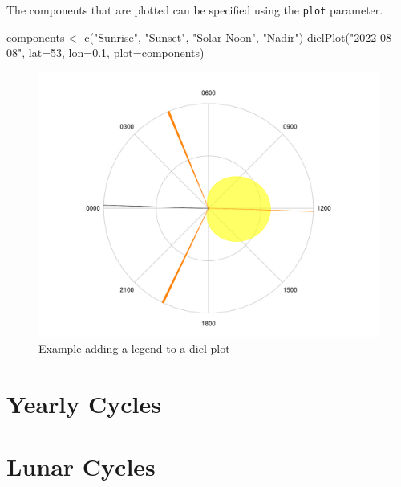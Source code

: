 \documentclass[
]{book}
\newenvironment{Shaded}{\begin{snugshade}}{\end{snugshade}}
\newcommand{\AttributeTok}[1]{\textcolor[rgb]{0.77,0.63,0.00}{#1}}
\newcommand{\DecValTok}[1]{\textcolor[rgb]{0.00,0.00,0.81}{#1}}
\newcommand{\FloatTok}[1]{\textcolor[rgb]{0.00,0.00,0.81}{#1}}
\newcommand{\FunctionTok}[1]{\textcolor[rgb]{0.00,0.00,0.00}{#1}}
\newcommand{\NormalTok}[1]{#1}
\newcommand{\OtherTok}[1]{\textcolor[rgb]{0.56,0.35,0.01}{#1}}
\newcommand{\StringTok}[1]{\textcolor[rgb]{0.31,0.60,0.02}{#1}}
\begin{document}
The components that are plotted can be specified using the \texttt{plot} parameter.

\begin{Shaded}
\begin{Highlighting}[]
\NormalTok{components }\OtherTok{\textless{}{-}} \FunctionTok{c}\NormalTok{(}\StringTok{"Sunrise"}\NormalTok{, }\StringTok{"Sunset"}\NormalTok{, }\StringTok{"Solar Noon"}\NormalTok{, }\StringTok{"Nadir"}\NormalTok{)}
\FunctionTok{dielPlot}\NormalTok{(}\StringTok{"2022{-}08{-}08"}\NormalTok{, }\AttributeTok{lat=}\DecValTok{53}\NormalTok{, }\AttributeTok{lon=}\FloatTok{0.1}\NormalTok{, }\AttributeTok{plot=}\NormalTok{components)}
\end{Highlighting}
\end{Shaded}

\begin{figure}

{\centering \includegraphics[width=0.9\linewidth]{_main_files/figure-latex/diel-plot-components-1} 

}

\caption{Example adding a legend to a diel plot}\label{fig:diel-plot-components}
\end{figure}

\hypertarget{yearly-cycles}{%
\section{Yearly Cycles}\label{yearly-cycles}}

\hypertarget{lunar-cycles}{%
\section{Lunar Cycles}\label{lunar-cycles}}
\end{document}
